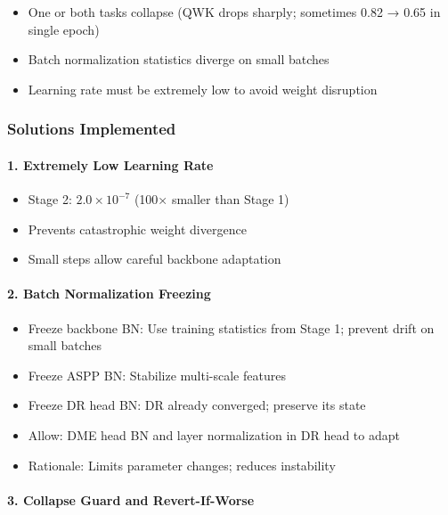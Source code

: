 \documentclass[12pt,a4paper]{article}
\begin{document}
\begin{itemize}
    \item One or both tasks collapse (QWK drops sharply; sometimes 0.82 → 0.65 in single epoch)
    \item Batch normalization statistics diverge on small batches
    \item Learning rate must be extremely low to avoid weight disruption
\end{itemize}

\subsubsection{Solutions Implemented}

\paragraph{1. Extremely Low Learning Rate}

\begin{itemize}
    \item Stage 2: $2.0 \times 10^{-7}$ (100× smaller than Stage 1)
    \item Prevents catastrophic weight divergence
    \item Small steps allow careful backbone adaptation
\end{itemize}

\paragraph{2. Batch Normalization Freezing}

\begin{itemize}
    \item Freeze backbone BN: Use training statistics from Stage 1; prevent drift on small batches
    \item Freeze ASPP BN: Stabilize multi-scale features
    \item Freeze DR head BN: DR already converged; preserve its state
    \item Allow: DME head BN and layer normalization in DR head to adapt
    \item Rationale: Limits parameter changes; reduces instability
\end{itemize}

\paragraph{3. Collapse Guard and Revert-If-Worse}
\end{document}

